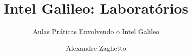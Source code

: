 \documentclass[graybox,envcountchap,sectrefs]{svmono}
\begin{document}
\author{Alexandre Zaghetto}
\title{Intel Galileo: Laboratórios}
\subtitle{Aulas Práticas Envolvendo o Intel Galileo}
\maketitle

\frontmatter%






\tableofcontents




\mainmatter%




\backmatter%


\printindex

\end{document}
